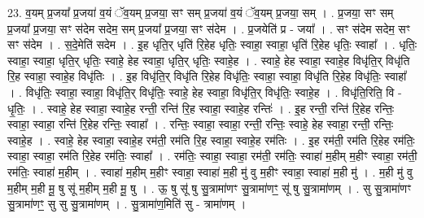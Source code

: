 \documentclass[17pt]{extarticle}
\begin{document}
23. व॒यम् प्र॒जया᳚ प्र॒जया॑ व॒यं ॅव॒यम् प्र॒जया॒ सꣳ सम् प्र॒जया॑ व॒यं ॅव॒यम् प्र॒जया॒ सम् । . प्र॒जया॒ सꣳ सम् प्र॒जया᳚ प्र॒जया॒ सꣳ स॑देम सदेम॒ सम् प्र॒जया᳚ प्र॒जया॒ सꣳ स॑देम । . प्र॒जयेति॑ प्र - जया᳚ । . सꣳ स॑देम सदेम॒ सꣳ सꣳ स॑देम । . स॒दे॒मेति॑ सदेम । . इ॒ह धृति॒र् धृति॑ रि॒हेह धृतिः॒ स्वाहा॒ स्वाहा॒ धृति॑ रि॒हेह धृतिः॒ स्वाहा᳚ । . धृतिः॒ स्वाहा॒ स्वाहा॒ धृति॒र् धृतिः॒ स्वाहे॒ हेह स्वाहा॒ धृति॒र् धृतिः॒ स्वाहे॒ह । . स्वाहे॒ हेह स्वाहा॒ स्वाहे॒ह विधृ॑ति॒र् विधृ॑ति रि॒ह स्वाहा॒ स्वाहे॒ह विधृ॑तिः । . इ॒ह विधृ॑ति॒र् विधृ॑ति रि॒हेह विधृ॑तिः॒ स्वाहा॒ स्वाहा॒ विधृ॑ति रि॒हेह विधृ॑तिः॒ स्वाहा᳚ । . विधृ॑तिः॒ स्वाहा॒ स्वाहा॒ विधृ॑ति॒र् विधृ॑तिः॒ स्वाहे॒ हेह स्वाहा॒ विधृ॑ति॒र् विधृ॑तिः॒ स्वाहे॒ह । . विधृ॑ति॒रिति॒ वि - धृ॒तिः॒ । . स्वाहे॒ हेह स्वाहा॒ स्वाहे॒ह रन्ती॒ रन्ति॑ रि॒ह स्वाहा॒ स्वाहे॒ह रन्तिः॑ । . इ॒ह रन्ती॒ रन्ति॑ रि॒हेह रन्तिः॒ स्वाहा॒ स्वाहा॒ रन्ति॑ रि॒हेह रन्तिः॒ स्वाहा᳚ । . रन्तिः॒ स्वाहा॒ स्वाहा॒ रन्ती॒ रन्तिः॒ स्वाहे॒ हेह स्वाहा॒ रन्ती॒ रन्तिः॒ स्वाहे॒ह । . स्वाहे॒ हेह स्वाहा॒ स्वाहे॒ह रम॑ती॒ रम॑ति रि॒ह स्वाहा॒ स्वाहे॒ह रम॑तिः । . इ॒ह रम॑ती॒ रम॑ति रि॒हेह रम॑तिः॒ स्वाहा॒ स्वाहा॒ रम॑ति रि॒हेह रम॑तिः॒ स्वाहा᳚ । . रम॑तिः॒ स्वाहा॒ स्वाहा॒ रम॑ती॒ रम॑तिः॒ स्वाहा॑ म॒हीम् म॒हीꣳ स्वाहा॒ रम॑ती॒ रम॑तिः॒ स्वाहा॑ म॒हीम् । . स्वाहा॑ म॒हीम् म॒हीꣳ स्वाहा॒ स्वाहा॑ म॒ही मु॑ वु म॒हीꣳ स्वाहा॒ स्वाहा॑ म॒ही मु॑ । . म॒ही मु॑ वु म॒हीम् म॒ही मू॒ षु सू॑ म॒हीम् म॒ही मू॒ षु । . ऊ॒ षु सू॑ षु सु॒त्रामा॑णꣳ सु॒त्रामा॑णꣳ॒॒ सू॑ षु सु॒त्रामा॑णम् । . सु सु॒त्रामा॑णꣳ सु॒त्रामा॑णꣳ॒॒ सु सु सु॒त्रामा॑णम् । . सु॒त्रामा॑ण॒मिति॑ सु - त्रामा॑णम् । \newline
\pagebreak
{}
\end{document}
